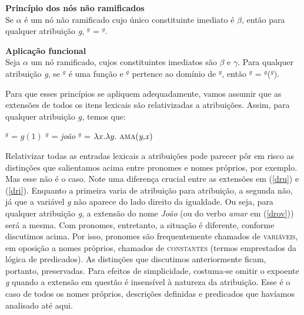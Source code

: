 \begin{tcolorbox}[boxrule=0pt,sharp corners]

\n \textbf{Princípio dos nós não ramificados}\\
Se $\alpha$ é um nó não ramificado cujo único constituinte
imediato é $\beta$, então para qualquer atribuição \textit{g},
\den{$\alpha$}$^{g}$ = \den{$\beta$}$^{g}$.

\end{tcolorbox}

\bigskip

\begin{tcolorbox}[boxrule=0pt,sharp corners]

\n\textbf{Aplicação funcional}\\
Seja $\alpha$ um nó ramificado, cujos constituintes imediatos são
$\beta$ e $\gamma$. Para qualquer atribuição \textit{g}, se
\den{$\beta$}$^{g}$ é uma função e \den{$\gamma$}$^{g}$ pertence ao
domínio de \den{$\beta$}$^{g}$, então \den{$\alpha$}$^{g}$ =
\den{$\beta$}$^{g}$(\den{$\gamma$}$^{g}$).

\end{tcolorbox}

\bigskip

Para que esses princípios se apliquem adequadamente, vamos assumir
que as extensões de todos os itens lexicais são relativizadas a atribuições. Assim, para qualquer atribuição $g$, temos que:

\begin{exe}
\ex\label{dr}
\begin{xlist}
\ex {}$^{g}$ = $g(1)$\label{dru}
\ex {}$^{g}$ = \textit{joão}\label{dri}
\ex {}$^{g}$ = $\lambda x.\lambda y.\ \predica{ama}{y,x}$\label{drov}
\end{xlist}
\end{exe}

Relativizar todas as entradas lexicais a atribuições pode
parecer pôr em risco as distinções que salientamos acima entre
pronomes e nomes próprios, por exemplo. Mas esse não é o caso.
Note uma diferença crucial entre as extensões em (\ref{dru}) e
(\ref{dri}). Enquanto a primeira varia de atribuição para
atribuição, a segunda não, já que a variável \textit{g}
não aparece do lado direito da igualdade. Ou seja, para qualquer
atribuição \textit{g}, a extensão do nome \textit{João} (ou do
verbo \textit{amar} em (\ref{drov})) será a mesma. Com pronomes, entretanto, a
situação é diferente, conforme discutimos acima. Por isso, pronomes são frequentemente chamados de \textsc{variáveis}, em oposição a nomes próprios, chamados de \textsc{constantes} (termos emprestados da lógica de predicados). As distinções que
discutimos anteriormente ficam, portanto, preservadas. Para efeitos de
simplicidade, costuma-se omitir o expoente \textit{g} quando a
extensão em questão é insensível à natureza da atribuição. Esse
é o caso de todos os nomes próprios, descrições definidas e
predicados que havíamos analisado até aqui.

